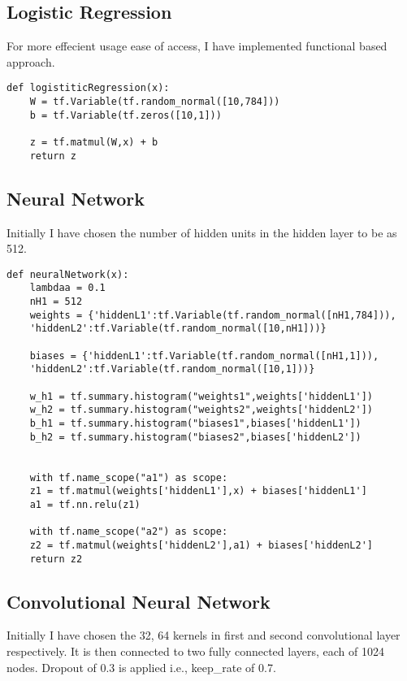 \documentclass[a4paper,11pt]{article}
\begin{document}
\subsection{Logistic Regression}

For more effecient usage ease of access, I have implemented functional based approach.

\begin{lstlisting}[label={list:second}]
def logistiticRegression(x):
	W = tf.Variable(tf.random_normal([10,784]))
	b = tf.Variable(tf.zeros([10,1]))

	z = tf.matmul(W,x) + b
	return z
\end{lstlisting}

\subsection{Neural Network}
Initially I have chosen the number of hidden units in the hidden layer to be as 512.

\begin{lstlisting}[label={list:second}]
def neuralNetwork(x):
	lambdaa = 0.1
	nH1 = 512
	weights = {'hiddenL1':tf.Variable(tf.random_normal([nH1,784])),
	'hiddenL2':tf.Variable(tf.random_normal([10,nH1]))}
	
	biases = {'hiddenL1':tf.Variable(tf.random_normal([nH1,1])),
	'hiddenL2':tf.Variable(tf.random_normal([10,1]))}
	
	w_h1 = tf.summary.histogram("weights1",weights['hiddenL1'])
	w_h2 = tf.summary.histogram("weights2",weights['hiddenL2'])
	b_h1 = tf.summary.histogram("biases1",biases['hiddenL1'])
	b_h2 = tf.summary.histogram("biases2",biases['hiddenL2'])
	
	
	with tf.name_scope("a1") as scope:
	z1 = tf.matmul(weights['hiddenL1'],x) + biases['hiddenL1']
	a1 = tf.nn.relu(z1)
	
	with tf.name_scope("a2") as scope:
	z2 = tf.matmul(weights['hiddenL2'],a1) + biases['hiddenL2']
	return z2
\end{lstlisting}

\subsection{Convolutional Neural Network}
Initially I have chosen the 32, 64 kernels in first and second convolutional layer respectively. It is then connected to two fully connected layers, each of 1024 nodes. Dropout of 0.3 is applied i.e., keep\_rate of 0.7.
\end{document}
